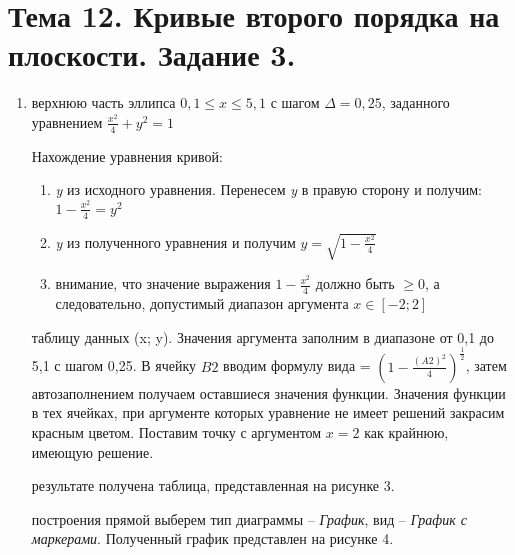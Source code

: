 \section{Тема 12. Кривые второго порядка на плоскости. Задание 3.}
\label{sec:task12}

\begin{enumerate}
	\item{} верхнюю часть эллипса $0,1 \leq x \leq 5,1$ с шагом $\Delta = 0,25$, заданного уравнением $\frac{x^2}{4} + y^2 = 1$

    \begin{item}
		Нахождение уравнения кривой:
		\begin{enumerate}
			\item{} \textit{y} из исходного уравнения. Перенесем \textit{y} в правую сторону и получим: $1 - \frac{x^2}{4} = y^2$
			\item{} \textit{y} из полученного уравнения и получим $y = \sqrt{1 - \frac{x^2}{4}}$
			\item{} внимание, что значение выражения $1 - \frac{x^2}{4}$ должно быть $\geq 0$, а следовательно, допустимый диапазон аргумента $x \in [-2;2]$
		\end{enumerate}
	\end{item}

	\begin{item}
		 таблицу данных (x; y). Значения аргумента заполним в диапазоне от 0,1 до 5,1 с шагом 0,25. В ячейку $B2$ вводим формулу вида = $(1 - \frac{(A2) ^ 2}{4}) ^ \frac{1}{2}$, затем автозаполнением получаем оставшиеся значения функции. Значения функции в тех ячейках, при аргументе которых уравнение не имеет решений закрасим красным цветом. Поставим точку с аргументом $x = 2$ как крайнюю, имеющую решение.

		 результате получена таблица, представленная на рисунке 3.

        \newpage

		 построения прямой выберем тип диаграммы -- \textit{График}, вид -- \textit{График с маркерами}. Полученный график представлен на рисунке 4.

	\end{item}
\end{enumerate}